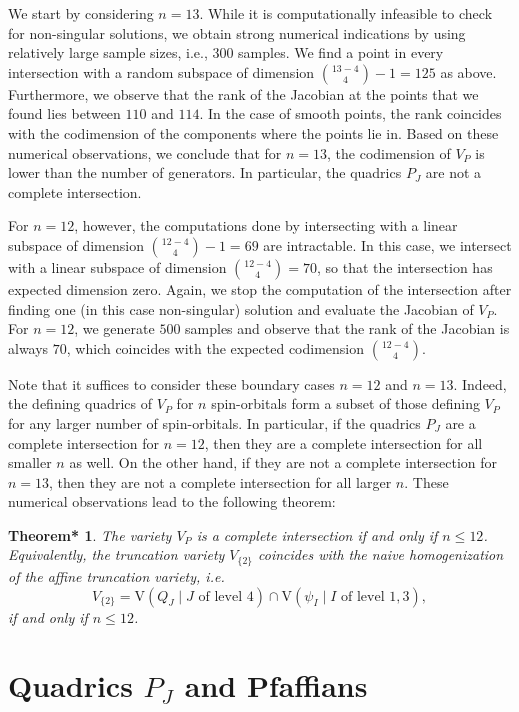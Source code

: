 \documentclass[11pt,reqno]{amsart}
\newtheorem{numtheorem}[theorem]{Theorem*}
\theoremstyle{definition}
\numberwithin{theorem}{section}
\numberwithin{equation}{section}
\begin{document}
We start by considering $n=13$.
While it is computationally infeasible to check for non-singular solutions, we obtain strong numerical indications by using relatively large sample sizes, i.e., 300 samples. We find a point in every intersection with a random subspace of dimension ${{13-4} \choose 4} -1 = 125$ as above. Furthermore, we observe that the rank of the Jacobian at the points that we found lies between $110$ and $114$. In the case of smooth points, the rank coincides with the codimension of the components where the points lie in. Based on these numerical observations, we conclude that for $n = 13$, the codimension of $V_P$ is lower than the number of generators. In particular, the quadrics $P_J$ are not a complete intersection.

For $n=12$, however, the computations done by intersecting with a linear subspace of dimension ${{12-4} \choose 4}-1 = 69$ are intractable. In this case, we intersect with a linear subspace of dimension ${{12-4} \choose 4} = 70$, so that the intersection has expected dimension zero. Again, we stop the computation of the intersection after finding one (in this case non-singular) solution and evaluate the Jacobian of $V_P$. For $n=12$, we generate $500$ samples and observe that the rank of the Jacobian is always $70$, which coincides with the expected codimension ${{12-4} \choose 4}$.

Note that it suffices to consider these boundary cases $n=12$ and $n=13$. Indeed, the defining quadrics of $V_P$ for $n$ spin-orbitals form a subset of those defining $V_P$ for any larger number of spin-orbitals. In particular, if the quadrics $P_J$ are a complete intersection for $n=12$, then they are a complete intersection for all smaller $n$ as well. On the other hand, if they are not a complete intersection for $n=13$, then they are not a complete intersection for all larger $n$.
These numerical observations lead to the following theorem: 

\begin{numtheorem}\label{thm: num theorem}
    The variety $V_P$ is a complete intersection if and only if $n \leq 12$. Equivalently, the truncation variety $V_{\{2\}}$ coincides with the naive homogenization of the affine truncation variety, i.e.
    \[ V_{\{2\}} = \textrm{V}(Q_J \mid J \textrm{ of level }4) \cap \textrm{V}(\psi_I\mid I \textrm{ of level }1,3),  \]
    if and only if $n \leq 12$.
    \end{numtheorem}

\section{Quadrics $P_J$ and Pfaffians}\label{sec: quadrics PJs and pfaffians}
\end{document}
